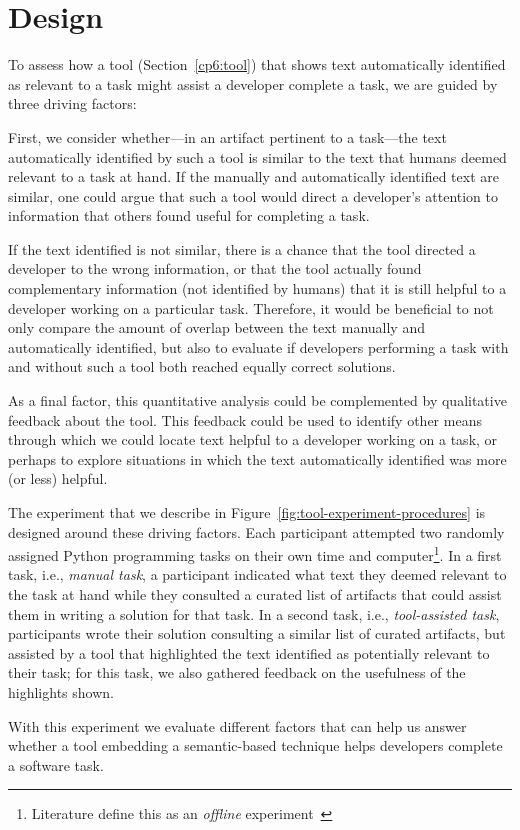 
\section{Design}
\label{cp6:design}



To assess how a tool (Section~\ref{cp6:tool}) that shows text automatically identified as relevant to a task
might assist a developer complete a task, we are guided by three driving factors:


First, we consider whether---in an artifact pertinent to a task---the  text automatically identified by such a tool is similar to the text that humans deemed relevant to a task at hand. 
If the manually and automatically identified text are similar, one could argue that such a tool  
would direct a developer's attention to information that others found useful for completing a task.


If the text identified is not similar, there is a chance that the tool directed a developer to the wrong information, or that 
the tool actually found complementary information (not identified by humans) that it is still helpful to a developer working on a particular task. 
Therefore, it would be beneficial to not only compare the amount of overlap between the text manually
and automatically identified, but also to evaluate if developers performing a task with and without such a tool  
both reached equally correct solutions.


As a final factor, this quantitative analysis could be complemented by qualitative feedback about the tool. 
This feedback could be used to identify other means through which we could locate 
text helpful to a developer working on a task, or perhaps to explore
situations in which the text automatically identified 
was more (or less) helpful.



The experiment that we describe in Figure~\ref{fig:tool-experiment-procedures} is designed around these driving factors.  
Each participant attempted two randomly assigned Python programming tasks on their own time and computer\footnote{Literature define this as an \textit{offline} experiment~\cite{wohlin2012, DeLucia2012}}.
In a first task, i.e., \textit{manual task}, a participant indicated 
what text they deemed relevant to the task at hand while 
they consulted a curated list of artifacts that could assist them in writing a solution for that task.
In a second task, i.e., \textit{tool-assisted task},
participants wrote their solution consulting a similar list of curated artifacts, but
assisted by a tool that highlighted the text identified as potentially relevant to their task; for this task, we also gathered feedback on the usefulness of the highlights shown.

 

With this experiment we evaluate different factors that can help us answer whether 
a tool embedding a semantic-based technique helps developers complete a software task. 
